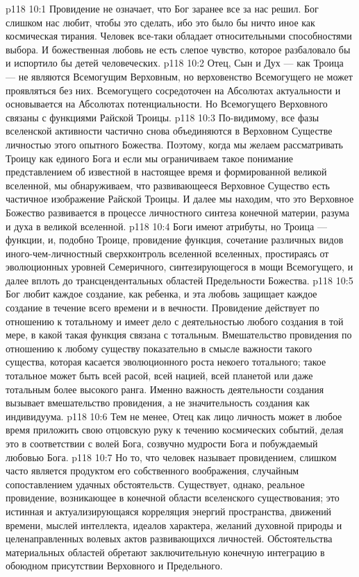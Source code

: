 \vs p118 10:1 Провидение не означает, что Бог заранее все за нас решил. Бог слишком нас любит, чтобы это сделать, ибо это было бы ничто иное как космическая тирания. Человек все\hyp{}таки обладает относительными способностями выбора. И божественная любовь не есть слепое чувство, которое разбаловало бы и испортило бы детей человеческих.
\vs p118 10:2 \pc Отец, Сын и Дух --- как Троица --- не являются Всемогущим Верховным, но верховенство Всемогущего не может проявляться без них.  Всемогущего сосредоточен на Абсолютах актуальности и основывается на Абсолютах потенциальности. Но  Всемогущего Верховного связаны с функциями Райской Троицы.
\vs p118 10:3 По\hyp{}видимому, все фазы вселенской активности частично снова объединяются в Верховном Существе личностью этого опытного Божества. Поэтому, когда мы желаем рассматривать Троицу как единого Бога и если мы ограничиваем такое понимание представлением об известной в настоящее время и формированной великой вселенной, мы обнаруживаем, что развивающееся Верховное Существо есть частичное изображение Райской Троицы. И далее мы находим, что это Верховное Божество развивается в процессе личностного синтеза конечной материи, разума и духа в великой вселенной.
\vs p118 10:4 Боги имеют атрибуты, но Троица --- функции, и, подобно Троице, провидение  функция, сочетание различных видов иного\hyp{}чем\hyp{}личностный сверхконтроль вселенной вселенных, простираясь от эволюционных уровней Семеричного, синтезирующегося в мощи Всемогущего, и далее вплоть до трансцендентальных областей Предельности Божества.
\vs p118 10:5 \pc Бог любит каждое создание, как ребенка, и эта любовь защищает каждое создание в течение всего времени и в вечности. Провидение действует по отношению к тотальному и имеет дело с деятельностью любого создания в той мере, в какой такая функция связана с тотальным. Вмешательство провидения по отношению к любому существу показательно в смысле важности  такого существа, которая касается эволюционного роста некоего тотального; такое тотальное может быть всей расой, всей нацией, всей планетой или даже тотальным более высокого ранга. Именно важность деятельности создания вызывает вмешательство провидения, а не значительность создания как индивидуума.
\vs p118 10:6 Тем не менее, Отец как лицо личность может в любое время приложить свою отцовскую руку к течению космических событий, делая это в соответствии с волей Бога, созвучно мудрости Бога и побуждаемый любовью Бога.
\vs p118 10:7 Но то, что человек называет провидением, слишком часто является продуктом его собственного воображения, случайным сопоставлением удачных обстоятельств. Существует, однако, реальное провидение, возникающее в конечной области вселенского существования; это истинная и актуализирующаяся корреляция энергий пространства, движений времени, мыслей интеллекта, идеалов характера, желаний духовной природы и целенаправленных волевых актов развивающихся личностей. Обстоятельства материальных областей обретают заключительную конечную интеграцию в обоюдном присутствии Верховного и Предельного.

